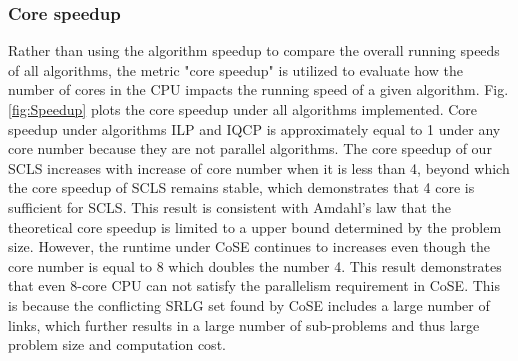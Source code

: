\subsubsection{Core speedup}
Rather than using the algorithm speedup to compare the overall running speeds of all algorithms, the metric "core speedup" is utilized to evaluate how the number of cores in the CPU impacts the running speed of a given algorithm.
Fig.\ref{fig:Speedup} plots the core speedup under all algorithms implemented.
Core speedup under algorithms ILP and IQCP is  approximately equal to 1 under any core number because they are not parallel algorithms. The core speedup of our SCLS increases with increase of core number when it is less than 4, beyond which the core speedup of SCLS remains stable, which demonstrates that 4 core is sufficient for SCLS. This result is consistent with Amdahl's law\cite{amdahl1967validity} that the theoretical core speedup is limited to a upper bound determined by the problem size. However, the runtime under CoSE continues to increases even though the core number is  equal to 8 which doubles the number 4. This result demonstrates that even 8-core CPU can not satisfy the parallelism requirement in CoSE. This is because the conflicting SRLG set found by CoSE includes  a large number of links,  which further results in a large number of sub-problems  and thus large problem size and  computation cost.


%

